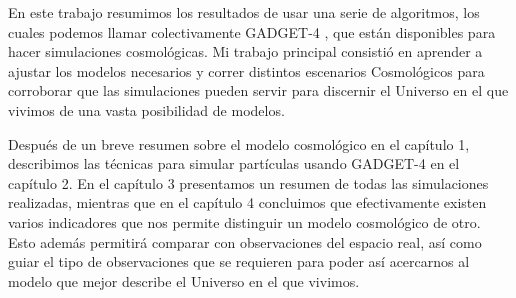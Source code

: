 En este trabajo resumimos los resultados de usar una serie de algoritmos, los cuales  podemos llamar colectivamente GADGET-4 \cite{2001NewA....6...79S,2021MNRAS.506.2871S}, que están disponibles para hacer simulaciones cosmológicas. Mi trabajo principal consistió en aprender a ajustar los modelos necesarios y correr distintos escenarios Cosmológicos para corroborar que las simulaciones pueden servir para discernir el Universo en el que vivimos de una vasta posibilidad de modelos.

Después de un breve resumen sobre el modelo cosmológico en el capítulo 1, describimos las técnicas para simular partículas usando GADGET-4 en el capítulo 2. En el capítulo 3 presentamos un resumen de todas las simulaciones realizadas, mientras que en el capítulo 4 concluimos que efectivamente existen varios indicadores que nos permite distinguir un modelo cosmológico de otro. Esto además permitirá comparar con observaciones del espacio real, así como guiar el tipo de observaciones que se requieren para poder así acercarnos al modelo que mejor describe el Universo en el que vivimos.









\lhead[\fancyplain{}{}]%
      {\fancyplain{}{\bfseries\rightmark}}
